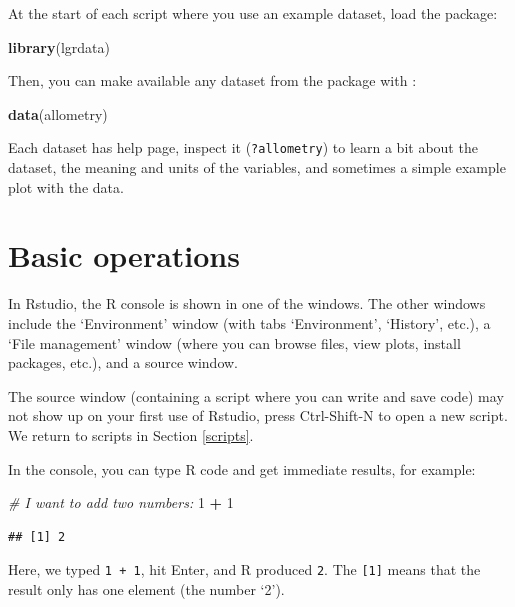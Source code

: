 \documentclass[]{book}
\newenvironment{Shaded}{\begin{snugshade}}{\end{snugshade}}
\newcommand{\CommentTok}[1]{\textcolor[rgb]{0.56,0.35,0.01}{\textit{#1}}}
\newcommand{\DecValTok}[1]{\textcolor[rgb]{0.00,0.00,0.81}{#1}}
\newcommand{\KeywordTok}[1]{\textcolor[rgb]{0.13,0.29,0.53}{\textbf{#1}}}
\newcommand{\NormalTok}[1]{#1}
\newcommand{\OperatorTok}[1]{\textcolor[rgb]{0.81,0.36,0.00}{\textbf{#1}}}
\newcommand{\StringTok}[1]{\textcolor[rgb]{0.31,0.60,0.02}{#1}}
\begin{document}
At the start of each script where you use an example dataset, load the package:

\begin{Shaded}
\begin{Highlighting}[]
\KeywordTok{library}\NormalTok{(lgrdata)}
\end{Highlighting}
\end{Shaded}

Then, you can make available any dataset from the package with :

\begin{Shaded}
\begin{Highlighting}[]
\KeywordTok{data}\NormalTok{(allometry)}
\end{Highlighting}
\end{Shaded}

Each dataset has help page, inspect it (\texttt{?allometry}) to learn a bit about the dataset, the meaning and units of the variables, and sometimes a simple example plot with the data.

\hypertarget{basicops}{%
\section{Basic operations}\label{basicops}}

In Rstudio, the R console is shown in one of the windows. The other windows include the `Environment' window (with tabs `Environment', `History', etc.), a `File management' window (where you can browse files, view plots, install packages, etc.), and a source window.

The source window (containing a script where you can write and save code) may not show up on your first use of Rstudio, press Ctrl-Shift-N to open a new script. We return to scripts in Section \ref{scripts}.

In the console, you can type R code and get immediate results, for example:

\begin{Shaded}
\begin{Highlighting}[]
\CommentTok{# I want to add two numbers:}
\DecValTok{1} \OperatorTok{+}\StringTok{ }\DecValTok{1}
\end{Highlighting}
\end{Shaded}

\begin{verbatim}
## [1] 2
\end{verbatim}

Here, we typed \texttt{1\ +\ 1}, hit Enter, and R produced \texttt{2}. The \texttt{{[}1{]}} means that the result only has one element (the number `2').
\end{document}
